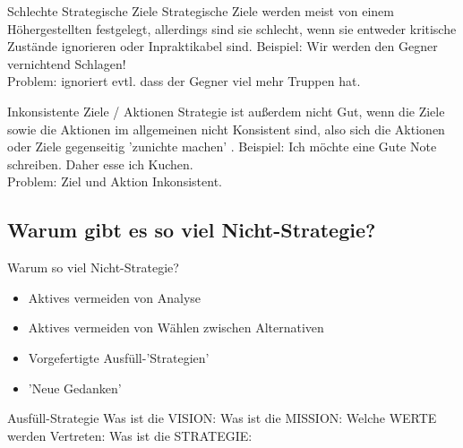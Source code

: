 \begin{frame}[c]{Schlechte Strategische Ziele}
    Strategische Ziele werden meist von einem Höhergestellten festgelegt,
    allerdings sind sie schlecht, wenn sie entweder kritische Zustände
    ignorieren oder Inpraktikabel sind.
    \newline
    \newline
    \pause
    Beispiel: Wir werden den Gegner vernichtend Schlagen! \\ \pause
    Problem: ignoriert evtl. dass der Gegner viel mehr Truppen hat.
\end{frame}


\begin{frame}[c]{Inkonsistente Ziele / Aktionen}
    Strategie ist außerdem nicht Gut, wenn die Ziele sowie die Aktionen im allgemeinen
    nicht Konsistent sind, also sich die Aktionen oder Ziele gegenseitig 'zunichte machen'
    .
    \newline
    \newline
    \pause
    Beispiel: Ich möchte eine Gute Note schreiben. Daher esse ich Kuchen. \\ \pause
    Problem: Ziel und Aktion Inkonsistent.
\end{frame}
\fi

\subsection{Warum gibt es so viel Nicht-Strategie?}

\begin{frame}[c]{Warum so viel Nicht-Strategie?}
    \Large
    \begin{itemize}
        \item Aktives vermeiden von Analyse \pause
        \item Aktives vermeiden von Wählen zwischen Alternativen \pause
        \item Vorgefertigte Ausfüll-'Strategien' \pause
        \item 'Neue Gedanken'
    \end{itemize}
\end{frame}


\ifonline
\begin{frame}[c]{Ausfüll-Strategie}
    Was ist die VISION:
    \newline
    \newline
    \newline
    Was ist die MISSION:
    \newline
    \newline
    \newline
    Welche WERTE werden Vertreten:
    \newline
    \newline
    \newline
    Was ist die STRATEGIE:
    \newline
    \newline
\end{frame}

